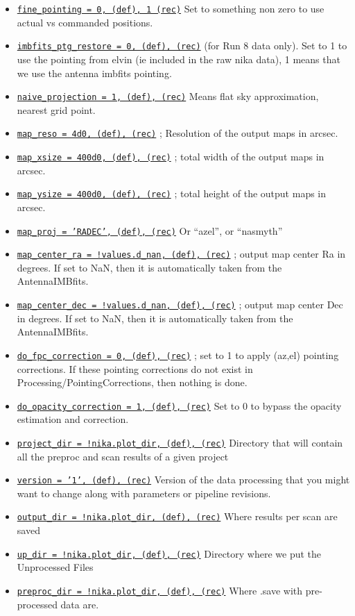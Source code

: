 \documentclass[a4paper,10pt]{article}
\begin{document}
\begin{itemize}
\item \underline{\tt fine\_pointing = 0, (def), 1 (rec)} Set to something non zero to use actual vs commanded positions.
\item \underline{\tt imbfits\_ptg\_restore =  0, (def), (rec)} (for Run 8 data
  only). Set to 1 to use the pointing from elvin (ie included in the raw nika data), 1 means that we use the antenna imbfits pointing.
\item \underline{\tt naive\_projection = 1, (def), (rec)} Means flat sky
  approximation, nearest grid point.
\item \underline{\tt map\_reso = 4d0, (def), (rec)} ; Resolution of the output
  maps in arcsec.
\item \underline{\tt map\_xsize = 400d0, (def), (rec)} ; total width of the
  output maps in arcsec.
\item \underline{\tt map\_ysize = 400d0, (def), (rec)} ; total height of the
  output maps in arcsec.
\item \underline{\tt map\_proj = 'RADEC', (def), (rec)} Or ``azel'', or ``nasmyth''
\item \underline{\tt map\_center\_ra = !values.d\_nan, (def), (rec)}  ; output map
  center Ra in degrees. If set to NaN, then it is automatically taken from the AntennaIMBfits.
\item \underline{\tt map\_center\_dec = !values.d\_nan, (def), (rec)} ; output map
  center Dec in degrees. If set to NaN, then it is automatically taken from the AntennaIMBfits.
\item \underline{\tt do\_fpc\_correction = 0, (def), (rec)} ; set to 1 to apply
  (az,el) pointing corrections. If these pointing corrections do not exist in
  Processing/PointingCorrections, then nothing is done.

\item \underline{\tt do\_opacity\_correction = 1, (def), (rec)} Set to 0 to bypass the opacity estimation and correction.

\item \underline{\tt project\_dir = !nika.plot\_dir, (def), (rec)} Directory that will contain all the preproc and scan results of a given project

\item \underline{\tt version = '1', (def), (rec)} Version of the data processing
  that you might want to change along with parameters or pipeline revisions.

\item \underline{\tt output\_dir = !nika.plot\_dir, (def), (rec)} Where results per scan are saved
\item \underline{\tt up\_dir = !nika.plot\_dir, (def), (rec)}  Directory where we put the Unprocessed Files
\item \underline{\tt preproc\_dir = !nika.plot\_dir, (def), (rec)} Where .save with pre-processed data are.


\end{itemize}
\end{document}
